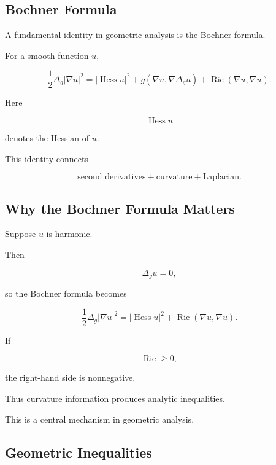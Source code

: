 \subsection{Bochner Formula}
\label{subsec:bochner-formula}

A fundamental identity in geometric analysis is the Bochner formula.

For a smooth function \(u\),

\[
\boxed{
\frac12
\Delta_g|\nabla u|^2
=
|\operatorname{Hess}u|^2
+
g(\nabla u,\nabla\Delta_g u)
+
\operatorname{Ric}(\nabla u,\nabla u).
}
\]

Here

\[
\operatorname{Hess}u
\]

denotes the Hessian of \(u\).

This identity connects

\[
\boxed{
\text{second derivatives}
+
\text{curvature}
+
\text{Laplacian}.
}
\]

\subsection{Why the Bochner Formula Matters}
\label{subsec:why-bochner-formula-matters}

Suppose \(u\) is harmonic.

Then

\[
\Delta_g u=0,
\]

so the Bochner formula becomes

\[
\boxed{
\frac12
\Delta_g|\nabla u|^2
=
|\operatorname{Hess}u|^2
+
\operatorname{Ric}(\nabla u,\nabla u).
}
\]

If

\[
\operatorname{Ric}\geq0,
\]

the right-hand side is nonnegative.

Thus curvature information produces analytic inequalities.

This is a central mechanism in geometric analysis.

\subsection{Geometric Inequalities}
\label{subsec:geometric-inequalities}

